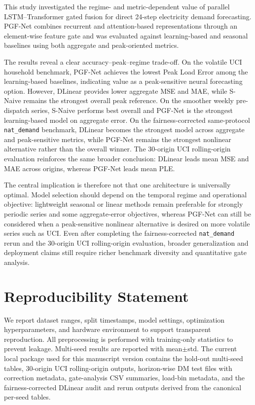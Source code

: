 \documentclass[pdflatex,sn-mathphys-num]{sn-jnl}
\theoremstyle{thmstyleone}
\theoremstyle{thmstyletwo}
\theoremstyle{thmstylethree}
\begin{document}
This study investigated the regime- and metric-dependent value of parallel LSTM--Transformer gated fusion for direct 24-step electricity demand forecasting. PGF-Net combines recurrent and attention-based representations through an element-wise feature gate and was evaluated against learning-based and seasonal baselines using both aggregate and peak-oriented metrics.

The results reveal a clear accuracy--peak--regime trade-off. On the volatile UCI household benchmark, PGF-Net achieves the lowest Peak Load Error among the learning-based baselines, indicating value as a peak-sensitive neural forecasting option. However, DLinear provides lower aggregate MSE and MAE, while S-Naive remains the strongest overall peak reference. On the smoother weekly pre-dispatch series, S-Naive performs best overall and PGF-Net is the strongest learning-based model on aggregate error. On the fairness-corrected same-protocol \texttt{nat\_demand} benchmark, DLinear becomes the strongest model across aggregate and peak-sensitive metrics, while PGF-Net remains the strongest nonlinear alternative rather than the overall winner. The 30-origin UCI rolling-origin evaluation reinforces the same broader conclusion: DLinear leads mean MSE and MAE across origins, whereas PGF-Net leads mean PLE.

The central implication is therefore not that one architecture is universally optimal. Model selection should depend on the temporal regime and operational objective: lightweight seasonal or linear methods remain preferable for strongly periodic series and some aggregate-error objectives, whereas PGF-Net can still be considered when a peak-sensitive nonlinear alternative is desired on more volatile series such as UCI. Even after completing the fairness-corrected \texttt{nat\_demand} rerun and the 30-origin UCI rolling-origin evaluation, broader generalization and deployment claims still require richer benchmark diversity and quantitative gate analysis.

\section*{Reproducibility Statement}

We report dataset ranges, split timestamps, model settings, optimization hyperparameters, and hardware environment to support transparent reproduction. All preprocessing is performed with training-only statistics to prevent leakage. Multi-seed results are reported with mean$\pm$std. The current local package used for this manuscript version contains the hold-out multi-seed tables, 30-origin UCI rolling-origin outputs, horizon-wise DM test files with correction metadata, gate-analysis CSV summaries, load-bin metadata, and the fairness-corrected DLinear audit and rerun outputs derived from the canonical per-seed tables.
\end{document}
